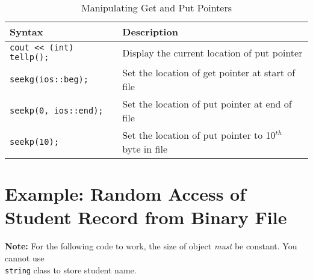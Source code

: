 \documentclass[12pt,a4paper]{article}
\begin{document}
\begin{table}[H]
\begin{center}
\vspace{0.3cm}
	\begin{tabular}{lp{9cm}}
	\hline \hline
		\textbf{Syntax} \rule{0pt}{2.6ex} & \textbf{Description}\\
		\hline
		\verb|cout << (int) tellp();| \rule{0pt}{2.6ex} & Display the current location of put pointer\\
		\verb|seekg(ios::beg);| \rule{0pt}{2.6ex} & Set the location of get pointer at start of file\\
		\verb|seekp(0, ios::end);| \rule{0pt}{2.6ex} & Set the location of put pointer at end of file\\
		\verb|seekp(10);| \rule{0pt}{2.6ex} & Set the location of put pointer to 10$^{th}$ byte in file\\
	\hline \hline
	\end{tabular}
\end{center}
\label{ManipulatingGetandPutPointers}
\caption{Manipulating Get and Put Pointers}
\section{Example: Random Access of Student Record from Binary File}
\noindent\textbf{Note:} For the following code to work, the size of object \textit{must} be constant. You cannot use\\ \texttt{string} class to store student name.\\
\end{table}
\end{document}
